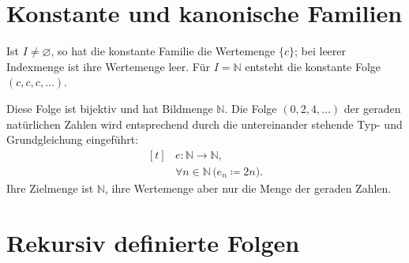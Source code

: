 \documentclass[main.tex]{subfiles}
\begin{document}
\section{Konstante und kanonische Familien}


Ist \(I\neq\varnothing\), so hat die konstante Familie die Wertemenge
\(\{c\}\); bei leerer Indexmenge ist ihre Wertemenge leer. Für
\(I=\mathbb N\) entsteht die konstante Folge \((c,c,c,\ldots)\).


Diese Folge ist bijektiv und hat Bildmenge \(\mathbb N\). Die Folge
\((0,2,4,\ldots)\) der geraden natürlichen Zahlen wird entsprechend durch
die untereinander stehende Typ- und Grundgleichung eingeführt:
\[
  \begin{aligned}[t]
    &e\colon\mathbb N\to\mathbb N,\\[-2pt]
    &\forall n\in\mathbb N\,\bigl(e_n\coloneqq 2n\bigr).
  \end{aligned}
\]
Ihre Zielmenge ist \(\mathbb N\), ihre Wertemenge aber nur die Menge der
geraden Zahlen.

\section{Rekursiv definierte Folgen}
\end{document}

